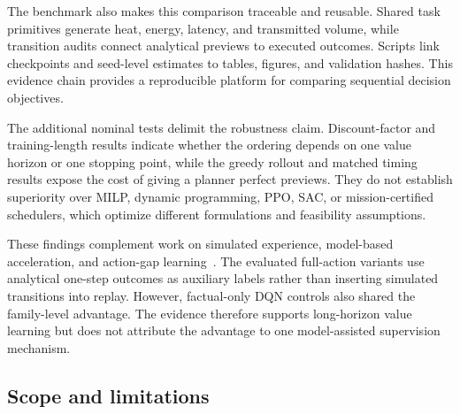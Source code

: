 \documentclass[remotesensing,article,submit,moreauthors]{Definitions/mdpi}
\newenvironment{revisedblock}{\color{red}}{}
\newenvironment{revisedblock}{}{}
\begin{document}
The benchmark also makes this comparison traceable and reusable. Shared task primitives generate heat, energy, latency, and transmitted volume, while transition audits connect analytical previews to executed outcomes. Scripts link checkpoints and seed-level estimates to tables, figures, and validation hashes. This evidence chain provides a reproducible platform for comparing sequential decision objectives.

\begin{revisedblock}
The additional nominal tests delimit the robustness claim. Discount-factor and training-length results indicate whether the ordering depends on one value horizon or one stopping point, while the greedy rollout and matched timing results expose the cost of giving a planner perfect previews. They do not establish superiority over MILP, dynamic programming, PPO, SAC, or mission-certified schedulers, which optimize different formulations and feasibility assumptions.
\end{revisedblock}

These findings complement work on simulated experience, model-based acceleration, and action-gap learning~\cite{sutton1991dyna,gu2016continuous,bellemare2016gap}. The evaluated full-action variants use analytical one-step outcomes as auxiliary labels rather than inserting simulated transitions into replay. However, factual-only DQN controls also shared the family-level advantage. The evidence therefore supports long-horizon value learning but does not attribute the advantage to one model-assisted supervision mechanism.

\subsection{Scope and limitations}
\end{document}
